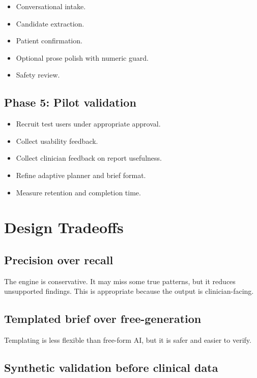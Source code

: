 \documentclass[11pt,a4paper]{article}
\begin{document}
\begin{itemize}
  \item Conversational intake.
  \item Candidate extraction.
  \item Patient confirmation.
  \item Optional prose polish with numeric guard.
  \item Safety review.
\end{itemize}

\subsection{Phase 5: Pilot validation}

\begin{itemize}
  \item Recruit test users under appropriate approval.
  \item Collect usability feedback.
  \item Collect clinician feedback on report usefulness.
  \item Refine adaptive planner and brief format.
  \item Measure retention and completion time.
\end{itemize}

\section{Design Tradeoffs}

\subsection{Precision over recall}

The engine is conservative. It may miss some true patterns, but it reduces unsupported findings. This is appropriate because the output is clinician-facing.

\subsection{Templated brief over free-generation}

Templating is less flexible than free-form AI, but it is safer and easier to verify.

\subsection{Synthetic validation before clinical data}
\end{document}
